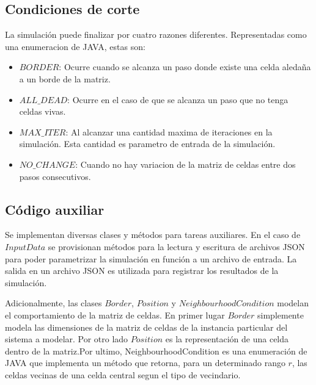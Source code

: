 \subsection{Condiciones de corte}\label{label:condiciones_de_corte}
    La simulación puede finalizar por cuatro razones diferentes. Representadas como una enumeracion de JAVA, estas son:
    \begin{itemize}
        \item $BORDER$: Ocurre cuando se alcanza un paso donde existe una celda aledaña a un borde de la matriz.
        \item $ALL\_DEAD$: Ocurre en el caso de que se alcanza un paso que no tenga celdas vivas.
        \item $MAX\_ITER$: Al alcanzar una cantidad maxima de iteraciones en la simulación. Esta cantidad es parametro de
            entrada de la simulación.
        \item $NO\_CHANGE$: Cuando no hay variacion de la matriz de celdas entre dos pasos consecutivos.
    \end{itemize}

\subsection{Código auxiliar}\label{label:codigo_aux}
    Se implementan diversas clases y métodos para tareas auxiliares. En el caso de $InputData$ se provisionan métodos
    para la lectura y escritura de archivos JSON para poder parametrizar la simulación en función a un archivo de entrada.
    La salida en un archivo JSON es utilizada para registrar los resultados de la simulación.

    Adicionalmente, las clases $Border$, $Position$ y $NeighbourhoodCondition$ modelan el comportamiento de la matriz de
    celdas. En primer lugar $Border$ simplemente modela las dimensiones de la matriz de celdas de la instancia particular
    del sistema a modelar. Por otro lado $Position$ es la representación de una celda dentro de la matriz.Por ultimo,
    NeighbourhoodCondition es una enumeración de JAVA que implementa un método que retorna, para un determinado rango
    $r$, las celdas vecinas de una celda central segun el tipo de vecindario.